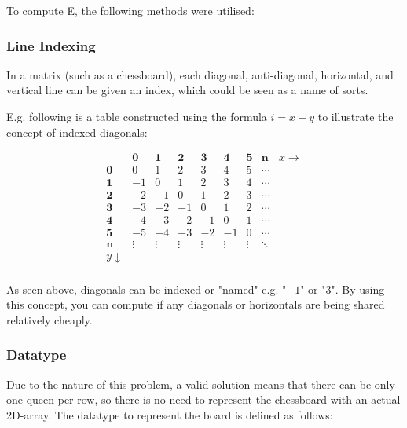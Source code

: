 \documentclass{article}
\begin{document}
To compute E, the following methods were utilised:

\clearpage
\subsubsection{Line Indexing}
In a matrix (such as a chessboard), each diagonal, anti-diagonal, horizontal, and vertical line can be given an index, which could be seen as a name of sorts.

E.g. following is a table constructed using the formula $i = x-y$ to illustrate the concept of indexed diagonals:

\[
    \begin{array}{c|cccccccc}
                   & \mathbf{0} & \mathbf{1} & \mathbf{2} & \mathbf{3} & \mathbf{4} & \mathbf{5} & \mathbf{n} & x \rightarrow \\
        \hline
        \mathbf{0} & 0          & 1          & 2          & 3          & 4          & 5          & \cdots                     \\
        \mathbf{1} & -1         & 0          & 1          & 2          & 3          & 4          & \cdots                     \\
        \mathbf{2} & -2         & -1         & 0          & 1          & 2          & 3          & \cdots                     \\
        \mathbf{3} & -3         & -2         & -1         & 0          & 1          & 2          & \cdots                     \\
        \mathbf{4} & -4         & -3         & -2         & -1         & 0          & 1          & \cdots                     \\
        \mathbf{5} & -5         & -4         & -3         & -2         & -1         & 0          & \cdots                     \\
        \mathbf{n} & \vdots     & \vdots     & \vdots     & \vdots     & \vdots     & \vdots     & \ddots                     \\
        y \downarrow                                                                                                          \\
    \end{array}
\]


As seen above, diagonals can be indexed or "named" e.g. "$-1$" or "$3$".
By using this concept, you can compute if any diagonals or horizontals are being shared relatively cheaply.

\subsubsection{Datatype}
Due to the nature of this problem, a valid solution means that there can be only one queen per row, so there is no need to represent the chessboard with an actual 2D-array.
The datatype to represent the board is defined as follows:
\end{document}
